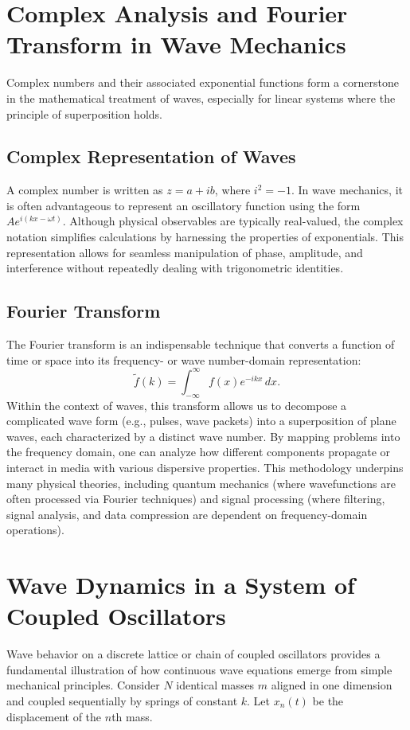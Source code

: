 \documentclass{article}
\begin{document}
\section{Complex Analysis and Fourier Transform in Wave Mechanics}
Complex numbers and their associated exponential functions form a cornerstone in the mathematical treatment of waves, especially for linear systems where the principle of superposition holds.

\subsection{Complex Representation of Waves}
A complex number is written as $z = a + ib$, where $i^2 = -1$. In wave mechanics, it is often advantageous to represent an oscillatory function using the form $Ae^{i(kx - \omega t)}$. Although physical observables are typically real-valued, the complex notation simplifies calculations by harnessing the properties of exponentials. This representation allows for seamless manipulation of phase, amplitude, and interference without repeatedly dealing with trigonometric identities.

\subsection{Fourier Transform}
The Fourier transform is an indispensable technique that converts a function of time or space into its frequency- or wave number-domain representation:
\begin{equation}
    \tilde{f}(k) = \int_{-\infty}^{\infty} f(x) e^{-i k x}\,dx.
\end{equation}
Within the context of waves, this transform allows us to decompose a complicated wave form (e.g., pulses, wave packets) into a superposition of plane waves, each characterized by a distinct wave number. By mapping problems into the frequency domain, one can analyze how different components propagate or interact in media with various dispersive properties. This methodology underpins many physical theories, including quantum mechanics (where wavefunctions are often processed via Fourier techniques) and signal processing (where filtering, signal analysis, and data compression are dependent on frequency-domain operations).

\section{Wave Dynamics in a System of Coupled Oscillators}
Wave behavior on a discrete lattice or chain of coupled oscillators provides a fundamental illustration of how continuous wave equations emerge from simple mechanical principles. Consider $N$ identical masses $m$ aligned in one dimension and coupled sequentially by springs of constant $k$. Let $x_n(t)$ be the displacement of the $n$th mass.
\end{document}
